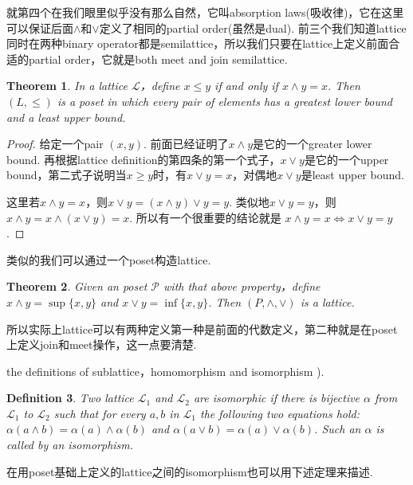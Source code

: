 \documentclass{article}
\newtheorem{theorem}{Theorem}[section]
\newtheorem{definition}[theorem]{Definition}
\newcommand\lattice{\mathcal{L}}
\begin{document}
{\color{blue} 就第四个在我们眼里似乎没有那么自然，它叫absorption laws(吸收律)，它在这里可以保证后面$\wedge$和$\vee$定义了相同的partial order(虽然是dual). 前三个我们知道lattice同时在两种binary operator都是semilattice，所以我们只要在lattice上定义前面合适的partial order，它就是both meet and join semilattice}. 

\begin{theorem}
\rm In a lattice $\lattice$，define $x \leq y$ if and only if $x \wedge y = x$. Then $(L,\leq)$ is a poset in which every pair of elements has a greatest lower bound and a least upper bound.  
\end{theorem}

\begin{proof}
给定一个pair $(x,y)$. 前面已经证明了$x \wedge y$是它的一个greater lower bound. 再根据lattice definition的第四条的第一个式子，$x \vee y$是它的一个upper bound，第二式子说明当$x \geq y$时，有$x \vee y = x$，对偶地$x \vee y$是least upper bound. 

这里若$x \wedge y = x$，则$x \vee y = (x \wedge y) \vee y = y$.  类似地$x \vee y = y$，则$x \wedge y = x \wedge (x \vee y) = x$.  所以有一个很重要的结论就是{\color{blue} $x \wedge y = x \iff x \vee y = y$}.
\end{proof}

{\color{red} 类似的我们可以通过一个poset构造lattice}.

\begin{theorem}
\rm Given an poset $\mathcal{P}$ with that above property，define $x \wedge y = \sup\{x,y\}$ and $x \vee y = \inf\{x,y\}$. Then $(P,\wedge,\vee)$ is a lattice.
\end{theorem}


{\color{blue} 所以实际上lattice可以有两种定义第一种是前面的代数定义，第二种就是在poset上定义join和meet操作，这一点要清楚}.


{\color{red} the definitions of sublattice，homomorphism and isomorphism )}.

\begin{definition}
\rm Two lattice $\lattice_1$ and $\lattice_2$ are {\color{red} isomorphic} if there is {\color{red} bijective} $\alpha$ from $\lattice_1$ to $\lattice_2$ such that for every $a,b$ in $\lattice_1$ the following two equations hold: $\alpha(a \wedge b) = \alpha(a) \wedge \alpha(b)$ and $\alpha(a \vee b) = \alpha(a) \vee \alpha(b)$. Such an $\alpha$ is called by an {\color{red} isomorphism}.  
\end{definition}

{\color{red} 在用poset基础上定义的lattice之间的isomorphism也可以用下述定理来描述}.
\end{document}

